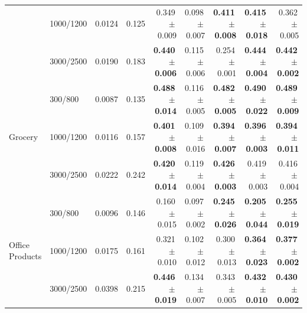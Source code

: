 \begin{table}[t]
\begin{tabular}{llrrrrrrr}
 & 1000/1200 & 0.0124 & 0.125 & 0.349\,$\pm$\,0.009 & 0.098\,$\pm$\,0.007 & \textbf{0.411}\,$\pm$\,\textbf{0.008} & \textbf{0.415}\,$\pm$\,\textbf{0.018} & 0.362\,$\pm$\,0.005 \\
 & 3000/2500 & 0.0190 & 0.183 & \textbf{0.440}\,$\pm$\,\textbf{0.006} & 0.115\,$\pm$\,0.006 & 0.254\,$\pm$\,0.001 & \textbf{0.444}\,$\pm$\,\textbf{0.004} & \textbf{0.442}\,$\pm$\,\textbf{0.002} \\
\midrule
\multirow{3}{*}{Grocery} & 300/800 & 0.0087 & 0.135 & \textbf{0.488}\,$\pm$\,\textbf{0.014} & 0.116\,$\pm$\,0.005 & \textbf{0.482}\,$\pm$\,\textbf{0.005} & \textbf{0.490}\,$\pm$\,\textbf{0.022} & \textbf{0.489}\,$\pm$\,\textbf{0.009} \\
 & 1000/1200 & 0.0116 & 0.157 & \textbf{0.401}\,$\pm$\,\textbf{0.008} & 0.109\,$\pm$\,0.016 & \textbf{0.394}\,$\pm$\,\textbf{0.007} & \textbf{0.396}\,$\pm$\,\textbf{0.003} & \textbf{0.394}\,$\pm$\,\textbf{0.011} \\
 & 3000/2500 & 0.0222 & 0.242 & \textbf{0.420}\,$\pm$\,\textbf{0.014} & 0.119\,$\pm$\,0.004 & \textbf{0.426}\,$\pm$\,\textbf{0.003} & 0.419\,$\pm$\,0.003 & 0.416\,$\pm$\,0.004 \\
\midrule
\multirow{3}{*}{Office Products} & 300/800 & 0.0096 & 0.146 & 0.160\,$\pm$\,0.015 & 0.097\,$\pm$\,0.002 & \textbf{0.245}\,$\pm$\,\textbf{0.026} & \textbf{0.205}\,$\pm$\,\textbf{0.044} & \textbf{0.255}\,$\pm$\,\textbf{0.019} \\
 & 1000/1200 & 0.0175 & 0.161 & 0.321\,$\pm$\,0.010 & 0.102\,$\pm$\,0.012 & 0.300\,$\pm$\,0.013 & \textbf{0.364}\,$\pm$\,\textbf{0.023} & \textbf{0.377}\,$\pm$\,\textbf{0.002} \\
 & 3000/2500 & 0.0398 & 0.215 & \textbf{0.446}\,$\pm$\,\textbf{0.019} & 0.134\,$\pm$\,0.007 & 0.343\,$\pm$\,0.005 & \textbf{0.432}\,$\pm$\,\textbf{0.010} & \textbf{0.430}\,$\pm$\,\textbf{0.002} \\
\bottomrule
\end{tabular}
\end{table}

